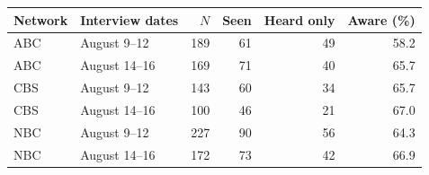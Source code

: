 \begin{tabular}{llrrrr}
\toprule
Network & Interview dates & $N$ & Seen & Heard only & Aware (\%) \\
\midrule
ABC & August 9--12 & 189 & 61 & 49 & 58.2 \\
ABC & August 14--16 & 169 & 71 & 40 & 65.7 \\
CBS & August 9--12 & 143 & 60 & 34 & 65.7 \\
CBS & August 14--16 & 100 & 46 & 21 & 67.0 \\
NBC & August 9--12 & 227 & 90 & 56 & 64.3 \\
NBC & August 14--16 & 172 & 73 & 42 & 66.9 \\
\bottomrule
\end{tabular}
